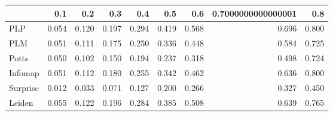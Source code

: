 \begin{tabular}{lrrrrrrrr}
\toprule
{} &   0.1 &   0.2 &   0.3 &   0.4 &   0.5 &   0.6 & 0.7000000000000001 &   0.8 \\
\midrule
PLP      & 0.054 & 0.120 & 0.197 & 0.294 & 0.419 & 0.568 &              0.696 & 0.800 \\
PLM      & 0.051 & 0.111 & 0.175 & 0.250 & 0.336 & 0.448 &              0.584 & 0.725 \\
Potts    & 0.050 & 0.102 & 0.150 & 0.194 & 0.237 & 0.318 &              0.498 & 0.724 \\
Infomap  & 0.051 & 0.112 & 0.180 & 0.255 & 0.342 & 0.462 &              0.636 & 0.800 \\
Surprise & 0.012 & 0.033 & 0.071 & 0.127 & 0.200 & 0.266 &              0.327 & 0.450 \\
Leiden   & 0.055 & 0.122 & 0.196 & 0.284 & 0.385 & 0.508 &              0.639 & 0.765 \\
\bottomrule
\end{tabular}
